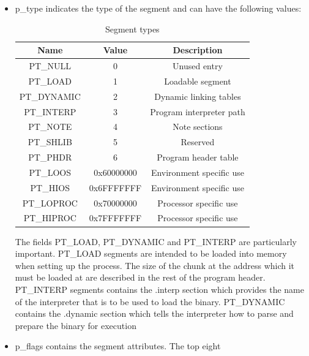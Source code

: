\documentclass[paper=a4, fontsize=11pt]{report} %
\numberwithin{equation}{section} %
\numberwithin{figure}{section} %
\numberwithin{table}{section} %
\begin{document}
\begin{itemize}
	\item {\ttfamily p\_type} indicates the type of the segment and can have 
	the following values:
	\begin{table}[!htbp]
		\begin{center}
			\begin{tabular}{|c|c|c|}
				\hline
				\textbf{Name} & \textbf{Value} & \textbf{Description}\\ 
				\hline
				{\ttfamily PT\_NULL} & 0 & Unused entry\\ \hline
				{\ttfamily PT\_LOAD} & 1 & Loadable segment\\ \hline
				{\ttfamily PT\_DYNAMIC} & 2 & Dynamic linking tables\\ \hline
				{\ttfamily PT\_INTERP} & 3 & Program interpreter path\\ \hline
				{\ttfamily PT\_NOTE} & 4 & Note sections\\ \hline
				{\ttfamily PT\_SHLIB} & 5 & Reserved\\ \hline
				{\ttfamily PT\_PHDR} & 6 & Program header table\\ \hline
				{\ttfamily PT\_LOOS} & 0x60000000 & Environment specific use\\ 
				\hline
				{\ttfamily PT\_HIOS} & 0x6FFFFFFF & Environment specific use\\ 
				\hline
				{\ttfamily PT\_LOPROC} & 0x70000000 & Processor specific use\\ 
				\hline
				{\ttfamily PT\_HIPROC} & 0x7FFFFFFF & Processor specific use\\ 
				\hline
			\end{tabular}
			\caption{Segment types}
			\label{segtypes}
		\end{center}
	\end{table}
	The fields {\ttfamily PT\_LOAD}, {\ttfamily PT\_DYNAMIC} and {\ttfamily 
	PT\_INTERP} are particularly important.
	{\ttfamily PT\_LOAD} segments are intended to be loaded into memory when 
	setting up the process. The size of the chunk at the address which it must 
	be loaded at are described in the rest of the program header.
	{\ttfamily PT\_INTERP} segments contains the {\ttfamily .interp} section 
	which provides the name of the interpreter that is to be used to load the 
	binary.
	{\ttfamily PT\_DYNAMIC} contains the {\ttfamily .dynamic} section which 
	tells the interpreter how to parse and prepare the binary for execution
	\item {\ttfamily p\_flags} contains the segment attributes. The top eight 

\end{itemize}
\end{document}
